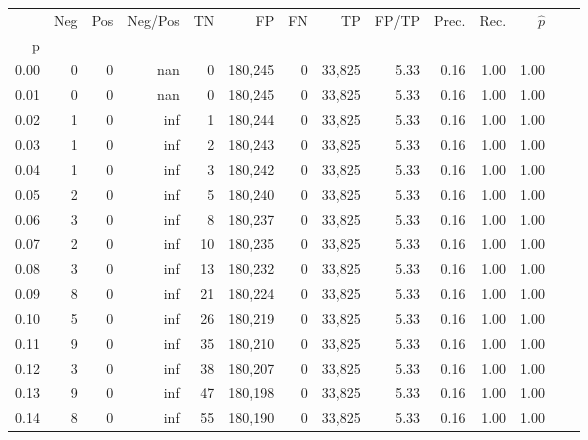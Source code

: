 \begin{tabular}{rrrrrrrrrrrrrr}
\toprule
{} &     Neg &    Pos & Neg/Pos &       TN &       FP &      FN &      TP & FP/TP & Prec. &  Rec. & $\hat{p}$ \\
p    &         &        &         &          &          &         &         &       &       &       &           \\
\midrule
0.00 &       0 &      0 &     nan &        0 &  180,245 &       0 &  33,825 &  5.33 &  0.16 &  1.00 &      1.00 \\
0.01 &       0 &      0 &     nan &        0 &  180,245 &       0 &  33,825 &  5.33 &  0.16 &  1.00 &      1.00 \\
0.02 &       1 &      0 &     inf &        1 &  180,244 &       0 &  33,825 &  5.33 &  0.16 &  1.00 &      1.00 \\
0.03 &       1 &      0 &     inf &        2 &  180,243 &       0 &  33,825 &  5.33 &  0.16 &  1.00 &      1.00 \\
0.04 &       1 &      0 &     inf &        3 &  180,242 &       0 &  33,825 &  5.33 &  0.16 &  1.00 &      1.00 \\
0.05 &       2 &      0 &     inf &        5 &  180,240 &       0 &  33,825 &  5.33 &  0.16 &  1.00 &      1.00 \\
0.06 &       3 &      0 &     inf &        8 &  180,237 &       0 &  33,825 &  5.33 &  0.16 &  1.00 &      1.00 \\
0.07 &       2 &      0 &     inf &       10 &  180,235 &       0 &  33,825 &  5.33 &  0.16 &  1.00 &      1.00 \\
0.08 &       3 &      0 &     inf &       13 &  180,232 &       0 &  33,825 &  5.33 &  0.16 &  1.00 &      1.00 \\
0.09 &       8 &      0 &     inf &       21 &  180,224 &       0 &  33,825 &  5.33 &  0.16 &  1.00 &      1.00 \\
0.10 &       5 &      0 &     inf &       26 &  180,219 &       0 &  33,825 &  5.33 &  0.16 &  1.00 &      1.00 \\
0.11 &       9 &      0 &     inf &       35 &  180,210 &       0 &  33,825 &  5.33 &  0.16 &  1.00 &      1.00 \\
0.12 &       3 &      0 &     inf &       38 &  180,207 &       0 &  33,825 &  5.33 &  0.16 &  1.00 &      1.00 \\
0.13 &       9 &      0 &     inf &       47 &  180,198 &       0 &  33,825 &  5.33 &  0.16 &  1.00 &      1.00 \\
0.14 &       8 &      0 &     inf &       55 &  180,190 &       0 &  33,825 &  5.33 &  0.16 &  1.00 &      1.00 \\

\end{tabular}
